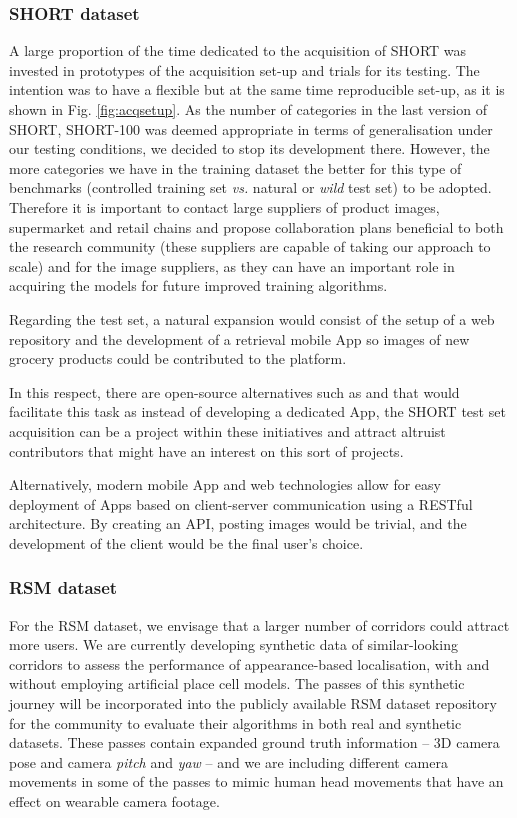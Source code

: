 \subsubsection{SHORT dataset}

A large proportion of the time dedicated to the acquisition of SHORT was invested in prototypes of the acquisition set-up and trials for its testing. The intention was to have a flexible but at the same time reproducible set-up, as it is shown in Fig. \ref{fig:acqsetup}. As the number of categories in the last version of SHORT, SHORT-100 was deemed appropriate in terms of generalisation under our testing conditions, we decided to stop its development there. However, the more categories we have in the training dataset the better for this type of benchmarks (controlled training set \textit{vs.} natural or \textit{wild} test set) to be adopted. Therefore it is important to contact large suppliers of product images, supermarket and retail chains and propose collaboration plans beneficial to both the research community (these suppliers are capable of taking our approach to scale) and for the image suppliers, as they can have an important role in acquiring the models for future improved training algorithms.

Regarding the test set, a natural expansion would consist of the setup of a web repository and the development of a retrieval mobile App so images of new grocery products could be contributed to the platform.

In this respect, there are open-source alternatives such as \cite{apple} and \cite{google} that would facilitate this task as instead of developing a dedicated App, the SHORT test set acquisition can be a project within these initiatives and attract altruist contributors that might have an interest on this sort of projects.

Alternatively, modern mobile App and web technologies allow for easy deployment of Apps based on client-server communication using a RESTful architecture. By creating an API, posting images would be trivial, and the development of the client would be the final user's choice.

\subsubsection{RSM dataset}
\label{sec:futureRSM}
For the RSM dataset, we envisage that a larger number of corridors could attract more users. We are currently developing synthetic data of similar-looking corridors to assess the performance of appearance-based localisation, with and without employing artificial place cell models. The passes of this synthetic journey will be incorporated into the publicly available RSM dataset repository for the community to evaluate their algorithms in both real and synthetic datasets. These passes contain expanded ground truth information -- 3D camera pose and camera \textit{pitch} and \textit{yaw} --  and we are including different camera movements in some of the passes to mimic human head movements that have an effect on wearable camera footage.

